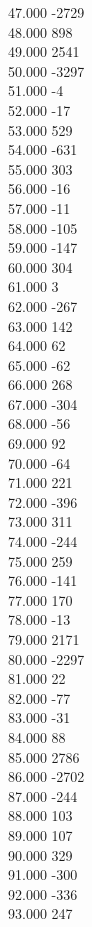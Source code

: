 { 47.000	-2729 \\
 48.000	898 \\
 49.000	2541 \\
 50.000	-3297 \\
 51.000	-4 \\
 52.000	-17 \\
 53.000	529 \\
 54.000	-631 \\
 55.000	303 \\
 56.000	-16 \\
 57.000	-11 \\
 58.000	-105 \\
 59.000	-147 \\
 60.000	304 \\
 61.000	3 \\
 62.000	-267 \\
 63.000	142 \\
 64.000	62 \\
 65.000	-62 \\
 66.000	268 \\
 67.000	-304 \\
 68.000	-56 \\
 69.000	92 \\
 70.000	-64 \\
 71.000	221 \\
 72.000	-396 \\
 73.000	311 \\
 74.000	-244 \\
 75.000	259 \\
 76.000	-141 \\
 77.000	170 \\
 78.000	-13 \\
 79.000	2171 \\
 80.000	-2297 \\
 81.000	22 \\
 82.000	-77 \\
 83.000	-31 \\
 84.000	88 \\
 85.000	2786 \\
 86.000	-2702 \\
 87.000	-244 \\
 88.000	103 \\
 89.000	107 \\
 90.000	329 \\
 91.000	-300 \\
 92.000	-336 \\
 93.000	247 \\
}
